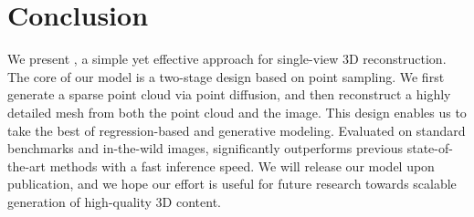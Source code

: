 \section{Conclusion}
\label{sec:conclusion}

We present \method, a simple yet effective approach for single-view 3D reconstruction. The core of our model is a two-stage design based on point sampling. We first generate a sparse point cloud via point diffusion, and then reconstruct a highly detailed mesh from both the point cloud and the image. This design enables us to take the best of regression-based and generative modeling. Evaluated on standard benchmarks and in-the-wild images, \method significantly outperforms previous state-of-the-art methods with a fast inference speed. We will release our model upon publication, and we hope our effort is useful for future research towards scalable generation of high-quality 3D content.